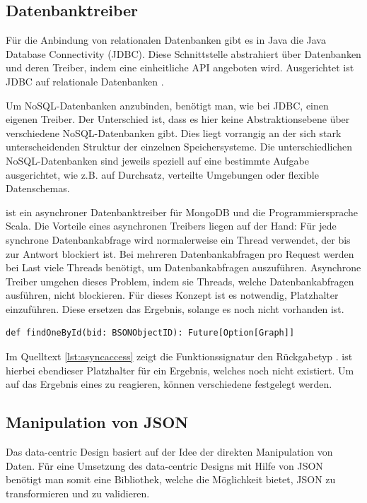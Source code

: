 \subsection{Datenbanktreiber}
\label{sec:reactive}
Für die Anbindung von relationalen Datenbanken gibt es in Java die Java Database Connectivity (JDBC). Diese Schnittstelle abstrahiert über Datenbanken und deren Treiber, indem eine einheitliche API angeboten wird. Ausgerichtet ist JDBC auf relationale Datenbanken \cite{reese2000database}.

Um NoSQL-Datenbanken anzubinden, benötigt man, wie bei JDBC, einen eigenen Treiber. Der Unterschied ist, dass es hier keine Abstraktionsebene über verschiedene NoSQL-Datenbanken gibt. Dies liegt vorrangig an der sich stark unterscheidenden Struktur der einzelnen Speichersysteme. Die unterschiedlichen NoSQL-Datenbanken sind jeweils speziell auf eine bestimmte Aufgabe ausgerichtet, wie z.B. auf Durchsatz, verteilte Umgebungen oder flexible Datenschemas. 

 ist ein asynchroner Datenbanktreiber für MongoDB und die Programmiersprache Scala. Die Vorteile eines asynchronen Treibers liegen auf der Hand: Für jede synchrone Datenbankabfrage wird normalerweise ein Thread verwendet, der bis zur Antwort blockiert ist. Bei mehreren Datenbankabfragen pro Request werden bei Last viele Threads benötigt, um Datenbankabfragen auszuführen. Asynchrone Treiber umgehen dieses Problem, indem sie Threads, welche Datenbankabfragen ausführen, nicht blockieren. Für dieses Konzept ist es notwendig, Platzhalter einzuführen. Diese ersetzen das Ergebnis, solange es noch nicht vorhanden ist.

\begin{lstlisting}[label=lst:asyncaccess, caption=Funktionssignatur für asynchronen Datenbankzugriff]
def findOneById(bid: BSONObjectID): Future[Option[Graph]]
\end{lstlisting}
 
Im Quelltext \ref{lst:asyncaccess} zeigt die Funktionssignatur den Rückgabetyp .  ist hierbei ebendieser Platzhalter für ein Ergebnis, welches noch nicht existiert. Um auf das Ergebnis eines  zu reagieren, können verschiedene  festgelegt werden.


\subsection{Manipulation von JSON}
Das data-centric Design basiert auf der Idee der direkten Manipulation von Daten. Für eine Umsetzung des data-centric Designs mit Hilfe von JSON benötigt man somit eine Bibliothek, welche die Möglichkeit bietet, JSON zu transformieren und zu validieren.
 
